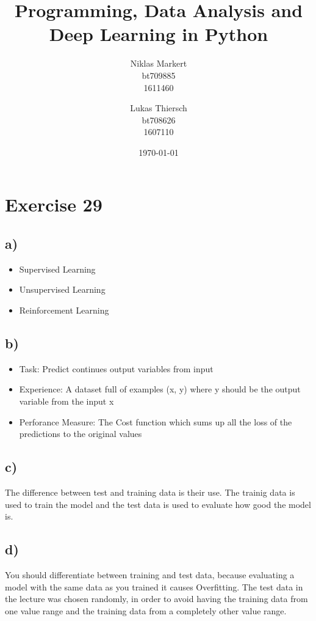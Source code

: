 \documentclass[a4paper]{article}
\title{\textbf{Programming, Data Analysis and \\ Deep Learning in Python}}
\date{\today}
\author{
     \sc Niklas Markert\\
    \small bt709885\\
    \small 1611460
  \and
     \sc Lukas Thiersch\\
    \small bt708626\\
    \small 1607110
}
\begin{document}
\maketitle

\section*{Exercise 29}
\subsection*{a)}
\begin{itemize}
    \item Supervised Learning
    \item Unsupervised Learning
    \item Reinforcement Learning
\end{itemize}

\subsection*{b)}
\begin{itemize}
    \item Task: Predict continues output variables from input
    \item Experience: A dataset full of examples (x, y) where y should be the output variable from the input x
    \item Perforance Measure: The Cost function which sums up all the loss of the predictions to the original values
\end{itemize}

\subsection*{c)}
The difference between test and training data is their use. The trainig data is used to train the model and the test data is used to evaluate how good the model is. 

\subsection*{d)}
You should differentiate between training and test data, because evaluating a model with the same data as you trained it causes Overfitting. \newline
The test data in the lecture was chosen randomly, in order to avoid having the training data from one value range and the training data from a completely other value range.
\end{document}
